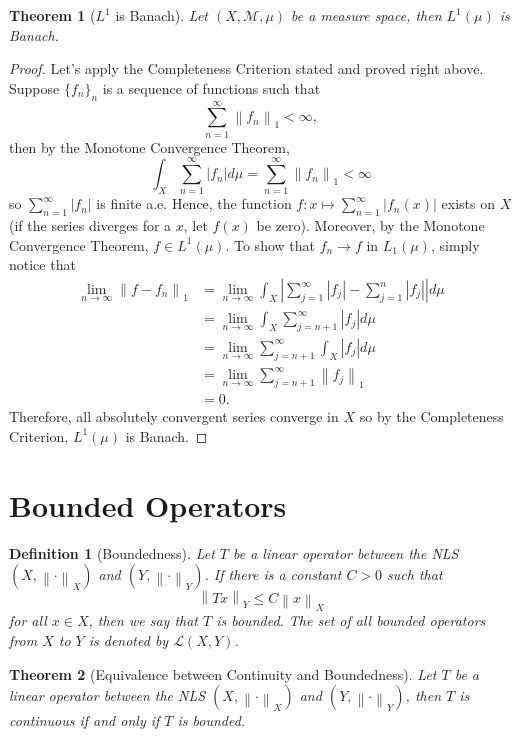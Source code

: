 \documentclass{article}
\newtheorem*{theorem}{Theorem}
\newtheorem*{definition}{Definition}
\newcommand{\M}{\mathcal{M}}
\renewcommand{\L}{\mathcal{L}}
\newcommand{\lnorm}[2]{\left\lVert#2 \right\rVert_{#1}}
\newcommand{\abs}[1]{\left\lvert#1 \right\rvert}
\begin{document}
\begin{theorem}[$L^1$ is Banach]
    Let $(X, \M, \mu)$ be a measure space, then $L^1(\mu)$ is Banach.
\end{theorem}

\begin{proof}
    Let's apply the Completeness Criterion stated and proved right above. Suppose $\{f_n\}_n$ is a sequence of functions such that 
    $$\sum_{n=1}^{\infty}\lnorm{1}{f_n} < \infty,$$
    then by the Monotone Convergence Theorem, 
    $$\int_X \sum_{n=1}^{\infty}|f_n|d \mu = \sum_{n=1}^{\infty}\lnorm{1}{f_n} < \infty$$
    so $\sum_{n=1}^{\infty}|f_n|$ is finite a.e. Hence, the function $f : x \mapsto \sum_{n=1}^{\infty}|f_n(x)|$ exists on $X$ (if the series diverges for a $x$, let $f(x)$ be zero). Moreover, by the Monotone Convergence Theorem, $f \in L^1(\mu)$. To show that $f_n \to f$ in $L_1(\mu)$, simply notice that
    \begin{align*}
        \lim_{n \rightarrow \infty}\lnorm{1}{f - f_n} &= \lim_{n \rightarrow \infty}\int_X \abs{\sum_{j=1}^{\infty}|f_j| - \sum_{j=1}^{n}|f_j|} d\mu \\
        &= \lim_{n \rightarrow \infty}\int_X \sum_{j=n+1}^{\infty}|f_j| d\mu \\
        &= \lim_{n \rightarrow \infty} \sum_{j=n+1}^{\infty} \int_X |f_j| d\mu \\
        &= \lim_{n \rightarrow \infty} \sum_{j=n+1}^{\infty} \lnorm{1}{f_j}\\
        &= 0.
    \end{align*}
    Therefore, all absolutely convergent series converge in $X$ so by the Completeness Criterion, $L^1(\mu)$ is Banach.
\end{proof}

\section{Bounded Operators}

\begin{definition}[Boundedness]
    Let $T$ be a linear operator between the NLS $(X, \lnorm{X}{\cdot})$ and $(Y, \lnorm{Y}{\cdot})$. If there is a constant $C > 0$ such that
    $$\lnorm{Y}{Tx} \leq C \lnorm{X}{x}$$
    for all $x \in X$, then we say that $T$ is bounded. The set of all bounded operators from $X$ to $Y$ is denoted by $\L(X,Y)$.
\end{definition}

\begin{theorem}[Equivalence between Continuity and Boundedness]
    Let $T$ be a linear operator between the NLS $(X, \lnorm{X}{\cdot})$ and $(Y, \lnorm{Y}{\cdot})$, then $T$ is continuous if and only if $T$ is bounded.
\end{theorem}
\end{document}
